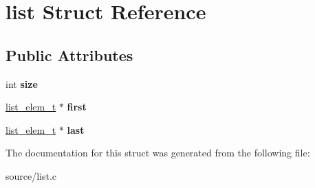 \hypertarget{structlist}{}\section{list Struct Reference}
\label{structlist}
\subsection*{Public Attributes}
\begin{DoxyCompactItemize}
\item 
int {\bfseries size}\hypertarget{structlist_a3b03adad0c0429bae9493667ff366dc2}{}\label{structlist_a3b03adad0c0429bae9493667ff366dc2}

\item 
\hyperlink{structlist__element}{list\+\_\+elem\+\_\+t} $\ast$ {\bfseries first}\hypertarget{structlist_ad6e55c2baf91efbf788801a497ed78e4}{}\label{structlist_ad6e55c2baf91efbf788801a497ed78e4}

\item 
\hyperlink{structlist__element}{list\+\_\+elem\+\_\+t} $\ast$ {\bfseries last}\hypertarget{structlist_a78222cdec256091cbe60eecc1d24a741}{}\label{structlist_a78222cdec256091cbe60eecc1d24a741}

\end{DoxyCompactItemize}


The documentation for this struct was generated from the following file\+:\begin{DoxyCompactItemize}
\item 
source/list.\+c\end{DoxyCompactItemize}
